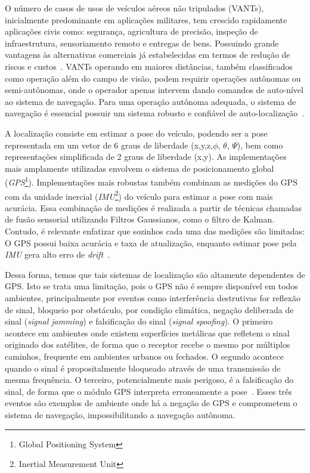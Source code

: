 O número de casos de usos de veículos aéreos não tripulados (VANTs), inicialmente predominante em aplicações militares, tem crescido rapidamente aplicações civis como: segurança, agricultura de precisão, inspeção de infraestrutura, sensoriamento remoto e entregas de bens. Possuindo grande vantagens às alternativas comerciais já estabelecidas em termos de redução de riscos e custos~\cite{8682048}. VANTs operando em maiores distâncias, também classificados como operação além do campo de visão, podem requirir operações autônomas ou semi-autônomas, onde o operador apenas intervem dando comandos de auto-nível ao sistema de navegação. Para uma operação autônoma adequada, o sistema de navegação é essencial possuir um sistema robusto e confiável de auto-localização~\cite{COUTURIER2021103666}.

A localização consiste em estimar a pose do veículo, podendo ser a pose representada em um vetor de 6 graus de liberdade (x,y,z,$\phi$, $\theta$, $\Psi$), bem como representações simplificada de 2 graus de liberdade (x,y).
As implementações mais amplamente utilizadas envolvem o sistema de posicionamento global (\textit{GPS}\footnote{Global Positioning System}). Implementações mais robustas também combinam as medições do GPS com da unidade inercial (\textit{IMU}\footnote{Inertial Measurement Unit}) do veículo para estimar a pose com mais acurácia. Essa combinação de medições é realizada a partir de técnicas chamadas de fusão sensorial utilizando Filtros Gaussianos, como o filtro de Kalman. Contudo, é relevante enfatizar que sozinhos cada uma das medições são limitadas: O GPS possui baixa acurácia e taxa de atualização, enquanto estimar pose pela \textit{IMU} gera alto erro de \textit{drift}~\cite{COUTURIER2021103666}.

Dessa forma, temos que tais sistemas de localização são altamente dependentes de GPS. Isto se trata uma limitação, pois o GPS não é sempre disponível em todos ambientes, principalmente por eventos como interferência destrutivas for reflexão de sinal, bloqueio por obstáculo, por condição climática, negação deliberada de sinal (\textit{signal jamming}) e falsificação do sinal (\textit{signal spoofing}).
O primeiro acontece em ambientes onde existem superfícies metálicas que refletem o sinal originado dos satélites, de forma que o receptor recebe o mesmo por múltiplos caminhos, frequente em ambientes urbanos ou fechados. O segundo acontece quando o sinal é propositalmente bloqueado através de uma transmissão de mesma frequência. O terceiro, potencialmente mais perigoso, é a falsificação do sinal, de forma que o módulo GPS interpreta erroneamente a pose~\cite{6837385}. Esses três eventos são exemplos de ambiente onde há a negação de GPS e comprometem o sistema de navegação, impossibilitando a navegação autônoma.

